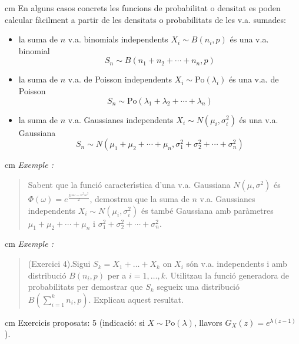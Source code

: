 \documentclass{article}
\newcounter{exctr}
\newenvironment{exemple}
{ \stepcounter{exctr} 
\hspace{0.2cm} 
\textit{Exemple  \arabic{exctr}: }
\it
\begin{quotation}
}{\end{quotation}}
\begin{document}
 cm
En alguns casos concrets les funcions de probabilitat o densitat es poden calcular f\`acilment a partir de les
densitats o probabilitats de les v.a. sumades:
\begin{itemize}
\item la suma de $n$ v.a. binomials independents $X_i \sim B(n_i, p)$ \'es una v.a. binomial $$S_n \sim B(n_1+n_2+\cdots+n_n, p)$$
\item la suma de $n$ v.a. de Poisson independents $X_i \sim \mathrm{Po}(\lambda_i)$ \'es una v.a. de Poisson 
$$S_n \sim \mathrm{Po}(\lambda_1+\lambda_2+\cdots+\lambda_n)$$
\item la suma de $n$ v.a. Gaussianes independents $X_i \sim N(\mu_i, \sigma_i^2)$ \'es una v.a. Gaussiana
$$S_n \sim N(\mu_1+\mu_2+\cdots+\mu_n, \sigma_1^2+\sigma_2^2+\cdots+\sigma_n^2)$$

\end{itemize}


 cm
\begin{exemple}
Sabent que la funci\'o caracter\'\i stica d'una v.a. Gaussiana $N(\mu, \sigma^2)$ \'es 
$\displaystyle \Phi(\omega)=e^{\frac{j\mu\omega - \sigma^2 \omega^2}{2}}$, demostrau que la 
suma de $n$ v.a. Gaussianes independents $X_i \sim N(\mu_i, \sigma_i^2)$ \'es tamb\'e Gaussiana
amb par\`ametres $\mu_1+\mu_2+\cdots+\mu_n$ i $\sigma_1^2+\sigma_2^2+\cdots+\sigma_n^2$.
\end{exemple}

 cm
\begin{exemple}
(Exercici 4).Sigui $S_{k}=X_{1}+\ldots+X_{k}$ on $X_{i}$ s\'on v.a.
independents i amb  distribuci\'o $B(n_{i},p)$ per a $i=1,\ldots,k$.
Utilitzau la funci\'o generadora de probabilitats per demostrar
que $S_{k}$ segueix una  distribuci\'o $B(\sum_{i=1}^k n_{i}, p)$.
Explicau aquest resultat.
\end{exemple}

 cm
\noindent
Exercicis proposats: 5 (indicaci\'o: si $X\sim \mathrm{Po}(\lambda)$, llavors $G_X(z)=e^{\lambda (z-1)}$).
\end{document}
